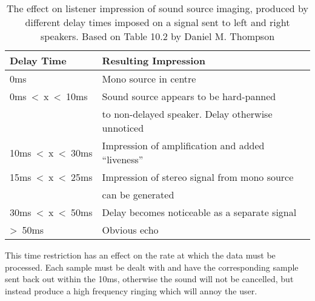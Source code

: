 \begin{table}[H]
	\centering
	\begin{tabular}[c]{| l | l |}
		\hline
		Delay Time			& Resulting Impression \\ \hline
		0ms				& Mono source in centre \\
		0ms~\textless~x~\textless~10ms	& Sound source appears to be hard-panned \\ & to non-delayed speaker. Delay otherwise unnoticed \\
		10ms~\textless~x~\textless~30ms	& Impression of amplification and added ``liveness'' \\
		15ms~\textless~x~\textless~25ms	& Impression of stereo signal from mono source \\ & can be generated \\
		30ms~\textless~x~\textless~50ms	& Delay becomes noticeable as a separate signal \\
		\textgreater~50ms		& Obvious echo \\
		\hline
	\end{tabular}
	\caption{The effect on listener impression of sound source imaging, produced by different delay times imposed on a signal sent to left and right speakers. Based on Table 10.2 by Daniel M. Thompson \cite{UnderstandingAudio}}
	\label{tab:delaytimes}
\end{table}
\noindent
This time restriction has an effect on the rate at which the data must be processed.
Each sample must be dealt with and have the corresponding sample sent back out within the 10ms, otherwise the sound will not be cancelled, but instead produce a high frequency ringing which will annoy the user.
